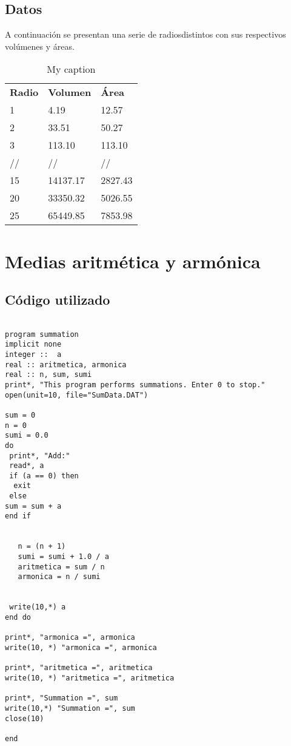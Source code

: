 \documentclass{article}
\begin{document}
\subsection{Datos}
A continuación se presentan una serie de radiosdistintos con sus respectivos volúmenes y áreas.
\begin{table}[]
\centering
\caption{My caption}
\label{my-label}
\begin{tabular}{lll}
\textbf{Radio} & \textbf{Volumen} & \textbf{Área} \\
1              & 4.19             & 12.57         \\
2              & 33.51            & 50.27         \\
3              & 113.10           & 113.10        \\
//             & //               & //            \\
15             & 14137.17         & 2827.43       \\
20             & 33350.32         & 5026.55       \\
25             & 65449.85         & 7853.98      
\end{tabular}
\end{table}


\section{Medias aritmética y armónica}

\subsection{Código utilizado}
\begin{verbatim}

program summation
implicit none
integer ::  a
real :: aritmetica, armonica
real :: n, sum, sumi
print*, "This program performs summations. Enter 0 to stop."
open(unit=10, file="SumData.DAT")

sum = 0
n = 0
sumi = 0.0
do
 print*, "Add:"
 read*, a
 if (a == 0) then
  exit
 else
sum = sum + a
end if

   
   n = (n + 1)
   sumi = sumi + 1.0 / a
   aritmetica = sum / n
   armonica = n / sumi


 write(10,*) a
end do

print*, "armonica =", armonica
write(10, *) "armonica =", armonica

print*, "aritmetica =", aritmetica
write(10, *) "aritmetica =", aritmetica

print*, "Summation =", sum
write(10,*) "Summation =", sum
close(10)

end

\end{verbatim}
\end{document}
